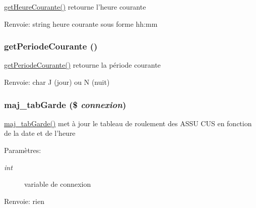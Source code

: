 \hyperlink{utilitaire__tr_8php_a1}{get\-Heure\-Courante()} retourne l'heure courante \begin{Desc}
\item[Renvoie:]string heure courante sous forme hh:mm \end{Desc}
\hypertarget{utilitaire__tr_8php_a3}{
\subsubsection[getPeriodeCourante]{\setlength{\rightskip}{0pt plus 5cm}get\-Periode\-Courante ()}}
\label{utilitaire__tr_8php_a3}


\hyperlink{utilitaire__tr_8php_a3}{get\-Periode\-Courante()} retourne la p\'{e}riode courante \begin{Desc}
\item[Renvoie:]char J (jour) ou N (nuit) \end{Desc}
\hypertarget{utilitaire__tr_8php_a0}{
\subsubsection[maj\_\-tabGarde]{\setlength{\rightskip}{0pt plus 5cm}maj\_\-tab\-Garde (\$ {\em connexion})}}
\label{utilitaire__tr_8php_a0}


\hyperlink{utilitaire__tr_8php_a0}{maj\_\-tab\-Garde()} met \`{a} jour le tableau de roulement des ASSU CUS en fonction de la date et de l'heure \begin{Desc}
\item[Param\`{e}tres:]
\begin{description}
\item[{\em int}]variable de connexion \end{description}
\end{Desc}
\begin{Desc}
\item[Renvoie:]rien \end{Desc}

